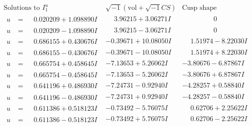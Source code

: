 \documentclass[1p]{elsarticle_modified}
\theoremstyle{definition}
\newcommand{\I}{\sqrt{-1}}
\begin{document}
$$\begin{array}{c|c|c}  
\text{Solutions to }I^u_{1}& \I (\text{vol} + \sqrt{-1}CS) & \text{Cusp shape}\\
 \hline 
\begin{aligned}
u &= \phantom{-}0.020209 + 1.098890 I\end{aligned}
 & \phantom{-}3.96215 + 3.06271 I & \phantom{-0.000000 } 0 \\ \hline\begin{aligned}
u &= \phantom{-}0.020209 - 1.098890 I\end{aligned}
 & \phantom{-}3.96215 - 3.06271 I & \phantom{-0.000000 } 0 \\ \hline\begin{aligned}
u &= \phantom{-}0.686155 + 0.430676 I\end{aligned}
 & -0.39671 + 10.08050 I & \phantom{-}1.51974 - 8.22030 I \\ \hline\begin{aligned}
u &= \phantom{-}0.686155 - 0.430676 I\end{aligned}
 & -0.39671 - 10.08050 I & \phantom{-}1.51974 + 8.22030 I \\ \hline\begin{aligned}
u &= \phantom{-}0.665754 + 0.458645 I\end{aligned}
 & -7.13653 + 5.26062 I & -3.80676 - 6.87867 I \\ \hline\begin{aligned}
u &= \phantom{-}0.665754 - 0.458645 I\end{aligned}
 & -7.13653 - 5.26062 I & -3.80676 + 6.87867 I \\ \hline\begin{aligned}
u &= \phantom{-}0.641196 + 0.486930 I\end{aligned}
 & -7.24731 - 0.92940 I & -4.28257 + 0.58840 I \\ \hline\begin{aligned}
u &= \phantom{-}0.641196 - 0.486930 I\end{aligned}
 & -7.24731 + 0.92940 I & -4.28257 - 0.58840 I \\ \hline\begin{aligned}
u &= \phantom{-}0.611386 + 0.518123 I\end{aligned}
 & -0.73492 - 5.76075 I & \phantom{-}0.62706 + 2.25622 I \\ \hline\begin{aligned}
u &= \phantom{-}0.611386 - 0.518123 I\end{aligned}
 & -0.73492 + 5.76075 I & \phantom{-}0.62706 - 2.25622 I \\ \hline\begin{aligned}

\end{aligned}
\end{array}$$
\end{document}
